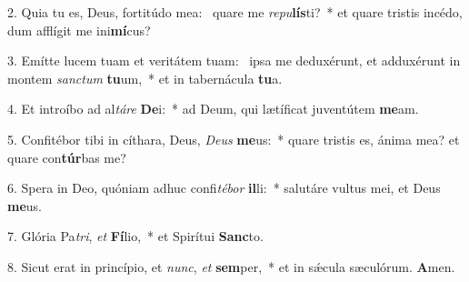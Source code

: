 2. Quia tu es, Deus, fortitúdo mea: \dag\  quare me \textit{re}\textit{pu}\textbf{lís}ti?~*  et quare tristis incédo, dum afflígit me ini\textbf{mí}cus?\

3. Emítte lucem tuam et veritátem tuam: \dag\  ipsa me deduxérunt, et adduxérunt in montem \textit{sanc}\textit{tum} \textbf{tu}um,~*  et in tabernácula \textbf{tu}a.\

4. Et introíbo ad al\textit{tá}\textit{re} \textbf{De}i:~*  ad Deum, qui lætíficat juventútem \textbf{me}am.\

5. Confitébor tibi in cíthara, Deus, \textit{De}\textit{us} \textbf{me}us:~*  quare tristis es, ánima mea? et quare con\textbf{túr}bas me?\

6. Spera in Deo, quóniam adhuc confi\textit{té}\textit{bor} \textbf{il}li:~*  salutáre vultus mei, et Deus \textbf{me}us.\

7. Glória Pa\textit{tri}, \textit{et} \textbf{Fí}lio,~*  et Spirítui \textbf{Sanc}to.\

8. Sicut erat in princípio, et \textit{nunc}, \textit{et} \textbf{sem}per,~*  et in sǽcula sæculórum. \textbf{A}men.\

